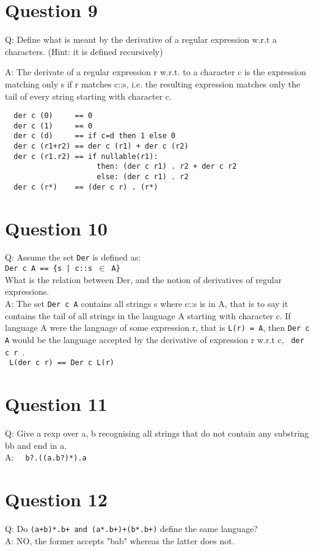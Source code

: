 \documentclass[english]{scrartcl}
\begin{document}
\section*{Question 9}
Q: Define what is meant by the derivative of a regular expression w.r.t a characters. (Hint: it is defined recursively)

A: The derivate of a regular expression r w.r.t. to a character c is the expression matching only s if r matches c::s, i.e. the resulting expression
matches only the tail of every string starting with character c.

\begin{verbatim}
  der c (0)     == 0
  der c (1)     == 0
  der c (d)     == if c=d then 1 else 0
  der c (r1+r2) == der c (r1) + der c (r2)
  der c (r1.r2) == if nullable(r1):
                     then: (der c r1) . r2 + der c r2
                     else: (der c r1) . r2
  der c (r*)    == (der c r) . (r*)
\end{verbatim}

\section*{Question 10}
Q: Assume the set \verb|Der| is defined as: \\
\verb~Der c A == {s | c::s ~$\in$\verb~ A}~ \\
What is the relation between Der, and the notion of derivatives of regular expressions. \\
A: The set \verb~Der c A~ contains all strings s where c::s is in A, that is to say it contains the tail of all strings in the language A starting with character c.
If language A were the language of some expression r, that is \verb~L(r) = A~, then \verb~Der c A~ would be the language accepted by the derivative
of expression r w.r.t c, \verb~ der c r ~. \\
\verb~ L(der c r) == Der c L(r) ~

\section*{Question 11}
Q: Give a rexp over {a, b} recognising all strings that do not contain any substring bb and end in a. \\
A: \verb~  b?.((a.b?)*).a ~

\section*{Question 12}
Q: Do \verb|(a+b)*.b+ and (a*.b+)+(b*.b+)| define the same language? \\
A: NO, the former accepts "bab" whereas the latter does not.
\end{document}
